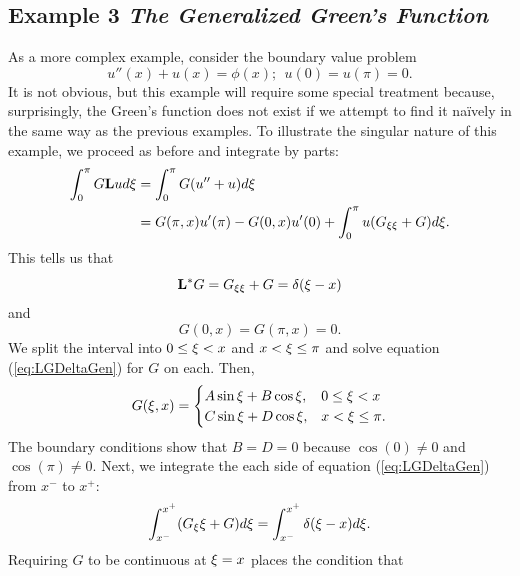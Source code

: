 \subsection{Example 3 \textit{The Generalized Green's Function}}
    As a more complex example, consider the boundary value problem
    \begin{equation}\label{eq:Gen1}
        u''(x) + u(x) = \phi(x);\ \ u(0) = u(\pi) = 0.
    \end{equation}
    It is not obvious, but this example will require some special treatment because, surprisingly, the Green's function does not exist if we attempt to find it na{\"i}vely in the same way as the previous examples. To illustrate the singular nature of this example, we proceed as before and integrate by parts:
    \begin{equation*}
        \begin{split}
            \int_{0}^{\pi} G\mathrm{\bf{L}} u d\xi &= \int_{0}^{\pi} G(u''+u) d\xi\\
            &= G(\pi,x)u'(\pi) - G(0,x)u'(0) + \int_{0}^{\pi} u (G_{\xi\xi}+G) d\xi.
        \end{split}
    \end{equation*}
    This tells us that
    \begin{equation}\label{eq:LGDeltaGen}
        \mathrm{\bf{L^*}} G = G_{\xi\xi} + G = \delta(\xi-x)
    \end{equation}
    and 
    \begin{equation*}
        G(0,x)=G(\pi,x) = 0.
    \end{equation*}
    We split the interval into \(0\leq \xi < x\) and \(x < \xi \leq \pi\) and solve equation (\ref{eq:LGDeltaGen}) for \(G\) on each. Then,
    \begin{equation*}
        G(\xi,x) = \begin{cases}
            A\sin\xi + B\cos\xi, & 0\leq \xi < x\\
            C\sin\xi + D\cos\xi, & x < \xi \leq \pi.
        \end{cases}
    \end{equation*}
    The boundary conditions show that \(B=D=0\) because \(\cos(0)\neq 0\) and \(\cos(\pi)\neq0\). Next, we integrate the each side of equation (\ref{eq:LGDeltaGen}) from \(x^-\) to \(x^+\):
    \begin{equation}\label{eq:GenGInt}
        \int_{x^-}^{x^+} (G_\xi\xi + G) d\xi = \int_{x^-}^{x^+} \delta(\xi-x)d\xi.
    \end{equation}
    Requiring \(G\) to be continuous at \(\xi=x\) places the condition that
